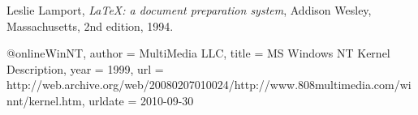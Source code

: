 \begin{thebibliography}{9}

  Leslie Lamport,
  \textit{\LaTeX: a document preparation system},
  Addison Wesley, Massachusetts,
  2nd edition,
  1994.

@online{WinNT,
	author = {MultiMedia LLC},
	title = {{MS Windows NT} Kernel Description},
	year = 1999,
	url = {http://web.archive.org/web/20080207010024/http://www.808multimedia.com/winnt/kernel.htm},
	urldate = {2010-09-30}
}

\end{thebibliography}
